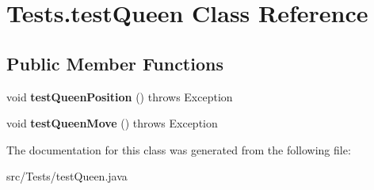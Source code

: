 \hypertarget{class_tests_1_1test_queen}{}\section{Tests.\+test\+Queen Class Reference}
\label{class_tests_1_1test_queen}
\subsection*{Public Member Functions}
\begin{DoxyCompactItemize}
\item 
\mbox{\label{class_tests_1_1test_queen_a930222f614a33a5b82e9940c00300cd8}} 
void {\bfseries test\+Queen\+Position} ()  throws Exception
\item 
\mbox{\label{class_tests_1_1test_queen_aa1a6f316cd8d4476574429be997ad60e}} 
void {\bfseries test\+Queen\+Move} ()  throws Exception
\end{DoxyCompactItemize}


The documentation for this class was generated from the following file\+:\begin{DoxyCompactItemize}
\item 
src/\+Tests/test\+Queen.\+java\end{DoxyCompactItemize}
